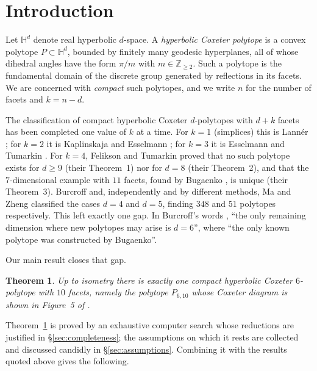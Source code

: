 \documentclass[11pt,reqno]{amsart}
\theoremstyle{plain}
\newtheorem{theorem}{Theorem}[section]
\theoremstyle{definition}
\newcommand{\HH}{\mathbb{H}}
\newcommand{\ZZ}{\mathbb{Z}}
\newcommand{\PP}{P_{6,10}}
\begin{document}
\maketitle

\section{Introduction}
\label{sec:intro}

Let $\HH^d$ denote real hyperbolic $d$-space. A \emph{hyperbolic Coxeter
polytope} is a convex polytope $P\subset\HH^d$, bounded by finitely many
geodesic hyperplanes, all of whose dihedral angles have the form $\pi/m$ with
$m\in\ZZ_{\ge 2}$. Such a polytope is the fundamental domain of the discrete
group generated by reflections in its facets. We are concerned with
\emph{compact} such polytopes, and we write $n$ for the number of facets and
$k = n-d$.

The classification of compact hyperbolic Coxeter $d$-polytopes with $d+k$ facets
has been completed one value of $k$ at a time. For $k=1$ (simplices) this is
Lann\'er \cite{Lanner1950}; for $k=2$ it is Kaplinskaja \cite{Kaplinskaja1974}
and Esselmann \cite{Esselmann1996}; for $k=3$ it is Esselmann
\cite{Esselmann1994} and Tumarkin \cite{Tumarkin2004}. For $k=4$, Felikson and
Tumarkin \cite{FeliksonTumarkin2008} proved that no such polytope exists for
$d\ge 9$ (their Theorem~1) nor for $d=8$ (their Theorem~2), and that the
$7$-dimensional example with $11$ facets, found by Bugaenko
\cite{Bugaenko1984}, is unique (their Theorem~3). Burcroff \cite{Burcroff2024}
and, independently and by different methods, Ma and Zheng
\cite{MaZheng2024,MaZheng2023} classified the cases $d=4$ and $d=5$, finding
$348$ and $51$ polytopes respectively. This left exactly one gap. In Burcroff's
words \cite[\S1]{Burcroff2024}, ``the only remaining dimension where new
polytopes may arise is $d=6$'', where ``the only known polytope was constructed
by Bugaenko''.

Our main result closes that gap.

\begin{theorem}
\label{thm:main}
Up to isometry there is exactly one compact hyperbolic Coxeter $6$-polytope with
$10$ facets, namely the polytope $\PP$ whose Coxeter diagram is shown in
Figure~5 of \cite{Burcroff2024}.
\end{theorem}

Theorem~\ref{thm:main} is proved by an exhaustive computer search whose
reductions are justified in \S\ref{sec:completeness}; the assumptions on which
it rests are collected and discussed candidly in \S\ref{sec:assumptions}.
Combining it with the results quoted above gives the following.
\end{document}
